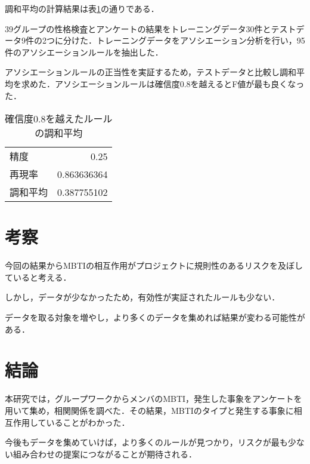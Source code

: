 \documentclass[uplatex,twocolumn,dvipdfmx]{jsarticle}
\begin{document}
調和平均の計算結果は表\ref{調和平均算出結果}の通りである．

39グループの性格検査とアンケートの結果をトレーニングデータ30件とテストデータ9件の2つに分けた．トレーニングデータをアソシエーション分析を行い，95件のアソシエーションルールを抽出した．

アソシエーションルールの正当性を実証するため，テストデータと比較し調和平均を求めた．アソシエーションルールは確信度0.8を越えるとF値が最も良くなった．

\renewcommand{\arraystretch}{0.75}
\begin{table}[htbp]
\centering
\caption{確信度0.8を越えたルールの調和平均}\label{調和平均算出結果}
\begin{tabular}{l|r}
\hline
精度 & 0.25\\
再現率 & 0.863636364\\
調和平均 & 0.387755102\\
\hline
\end{tabular}
\end{table}
\renewcommand{\arraystretch}{0.75}


\section{考察}
今回の結果からMBTIの相互作用がプロジェクトに規則性のあるリスクを及ぼしていると考える．

しかし，データが少なかったため，有効性が実証されたルールも少ない．

データを取る対象を増やし，より多くのデータを集めれば結果が変わる可能性がある．

\section{結論}
本研究では，グループワークからメンバのMBTI，発生した事象をアンケートを用いて集め，相関関係を調べた．その結果，MBTIのタイプと発生する事象に相互作用していることがわかった．

今後もデータを集めていけば，より多くのルールが見つかり，リスクが最も少ない組み合わせの提案につながることが期待される．


\end{document}
